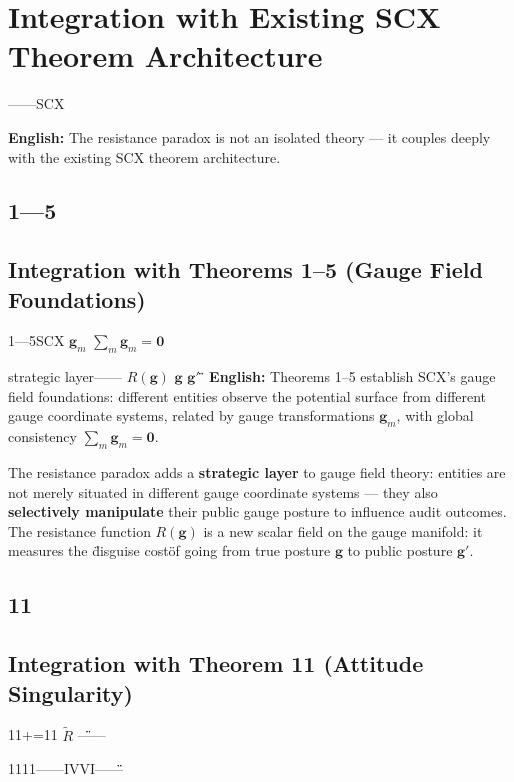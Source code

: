 \documentclass[12pt,a4paper]{article}
\theoremstyle{remark}
\newcommand{\g}{\mathbf{g}}
\begin{document}
\section{Integration with Existing SCX Theorem Architecture}

\noindent
\textbf{} ——SCX

\vspace{6pt}
\noindent
\textbf{English:} The resistance paradox is not an isolated theory — it couples deeply with the existing SCX theorem architecture.

\subsection{1—5}
\subsection{Integration with Theorems 1--5 (Gauge Field Foundations)}

\noindent
\textbf{} 1—5SCX $ \g_m $  $ \sum_m \g_m = \mathbf{0} $

\textbf{}strategic layer——\textbf{} $ R(\g) $  $ \g $  $ \g' $ \"\"

\vspace{4pt}
\noindent
\textbf{English:} Theorems 1--5 establish SCX's gauge field foundations: different entities observe the potential surface from different gauge coordinate systems, related by gauge transformations $ \g_m $, with global consistency $ \sum_m \g_m = \mathbf{0} $.

The resistance paradox adds a \textbf{strategic layer} to gauge field theory: entities are not merely situated in different gauge coordinate systems — they also \textbf{selectively manipulate} their public gauge posture to influence audit outcomes. The resistance function $ R(\g) $ is a new scalar field on the gauge manifold: it measures the \"disguise cost\" of going from true posture $ \g $ to public posture $ \g' $.

\subsection{11}
\subsection{Integration with Theorem 11 (Attitude Singularity)}

\noindent
\textbf{} 11+=11\textbf{} $ \tilde{R} $ \"\"——

1111——IVVI——\"\"
\end{document}
